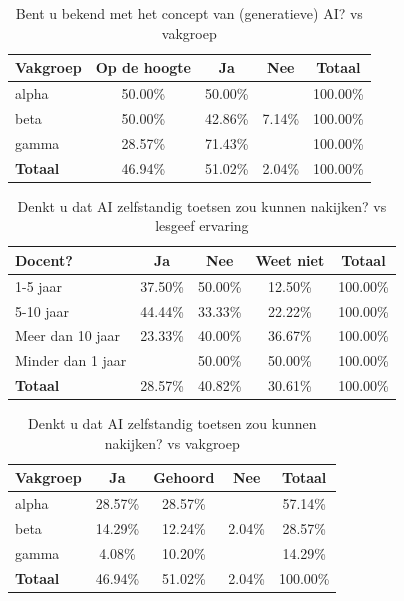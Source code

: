 \documentclass[12pt]{article}
\begin{document}
\noindent
\begin{table}[H]
    \caption{Bent u bekend met het concept van (generatieve) AI? vs vakgroep}

    \begin{tabular}{l c c c c}
        \toprule
        \textbf{Vakgroep} & \textbf{Op de hoogte} & \textbf{Ja} & \textbf{Nee} & \textbf{Totaal} \\
        \midrule
        alpha & 50.00\% & 50.00\% &  & 100.00\% \\
        beta  & 50.00\% & 42.86\% & 7.14\% & 100.00\% \\
        gamma & 28.57\% & 71.43\% &  & 100.00\% \\
        \midrule
        \textbf{Totaal} & 46.94\% & 51.02\% & 2.04\% & 100.00\% \\
        \bottomrule
    \end{tabular}
\end{table}

\noindent
\begin{table}[H]
\caption{Denkt u dat AI zelfstandig toetsen zou kunnen nakijken? vs lesgeef ervaring}
    \begin{tabular}{l c c c c}
        \toprule
        \textbf{Docent?} & \textbf{Ja} & \textbf{Nee} & \textbf{Weet niet} & \textbf{Totaal} \\
        \midrule
        1-5 jaar      & 37.50\% & 50.00\% & 12.50\% & 100.00\% \\
        5-10 jaar     & 44.44\% & 33.33\% & 22.22\% & 100.00\% \\
        Meer dan 10 jaar & 23.33\% & 40.00\% & 36.67\% & 100.00\% \\
        Minder dan 1 jaar &  & 50.00\% & 50.00\% & 100.00\% \\
        \midrule
        \textbf{Totaal} & 28.57\% & 40.82\% & 30.61\% & 100.00\% \\
        \bottomrule
    \end{tabular}
\end{table}

\noindent
\begin{table}[H]


    \caption{Denkt u dat AI zelfstandig toetsen zou kunnen nakijken? vs vakgroep}

    \begin{tabular}{l c c c c}
        \toprule
        \textbf{Vakgroep} & \textbf{Ja} & \textbf{Gehoord} & \textbf{Nee} & \textbf{Totaal} \\
        \midrule
        alpha & 28.57\% & 28.57\% &  & 57.14\% \\
        beta  & 14.29\% & 12.24\% & 2.04\% & 28.57\% \\
        gamma & 4.08\%  & 10.20\% &  & 14.29\% \\
        \midrule
        \textbf{Totaal} & 46.94\% & 51.02\% & 2.04\% & 100.00\% \\
        \bottomrule
    \end{tabular}
\end{table}
\end{document}
